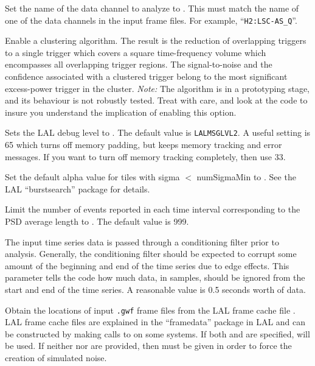 \begin{entry}
\begin{entry}
\item[\option{--channel-name} \parm{string}]
Set the name of the data channel to analyze to .  This must
match the name of one of the data channels in the input frame files.  For
example, ``\verb|H2:LSC-AS_Q|''.

\item[\option{--cluster}]
Enable a clustering algorithm.  The result is the reduction of overlapping
triggers to a single trigger which covers a square time-frequency volume
which encompasses all overlapping trigger regions.   The signal-to-noise
and the confidence associated with a clustered trigger belong to the most
significant excess-power trigger in the cluster.  \emph{Note:}  The
algorithm is in a prototyping stage, and its behaviour is not robustly
tested.  Treat with care, and look at the code to insure you understand the
implication of enabling this option.

\item[\option{--debug-level} \parm{level}]
Sets the LAL debug level to .  The default value is
\texttt{LALMSGLVL2}.  A useful setting is 65 which turns off memory
padding, but keeps memory tracking and error messages.  If you want to turn
off memory tracking completely, then use 33.

\item[\option{--default-alpha} \parm{alpha}]
Set the default alpha value for tiles with sigma $<$ numSigmaMin to
.  See the LAL ``burstsearch'' package for details.

\item[\option{--event-limit} \parm{count}]
Limit the number of events reported in each time interval corresponding to
the PSD average length to .  The default value is 999.

\item[\option{--filter-corruption} \parm{samples}]
The input time series data is passed through a conditioning filter prior to
analysis.  Generally, the conditioning filter should be expected to corrupt
some amount of the beginning and end of the time series due to edge
effects.  This parameter tells the code how much data, in samples, should
be ignored from the start and end of the time series.  A reasonable value
is 0.5 seconds worth of data.

\item[\option{--frame-cache} \parm{cache file}]
Obtain the locations of input \texttt{.gwf} frame files from the LAL frame
cache file .  LAL frame cache files are explained in the
``framedata'' package in LAL and can be constructed by making calls to
 on some systems.  If both  and
 are specified,  will be used.  If
neither  nor  are provided, then
 must be given in order to force the creation of
simulated noise.


\end{entry}
\end{entry}
